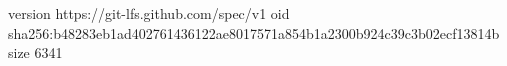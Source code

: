 version https://git-lfs.github.com/spec/v1
oid sha256:b48283eb1ad402761436122ae8017571a854b1a2300b924c39c3b02ecf13814b
size 6341
